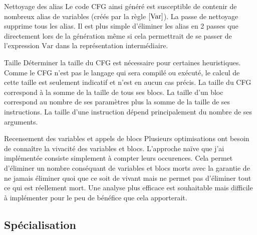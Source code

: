\documentclass{beamer}
\begin{document}
\begin{frame}{Nettoyage des alias}
    Le code CFG ainsi généré est susceptible de contenir de nombreux alias de variables (créés par la règle $\eqref{Var}$). La passe de nettoyage supprime tous les alias. Il est plus simple d'éliminer les alias en 2 passes que directement lors de la génération même si cela permettrait de se passer de l'expression $\text{Var}$ dans la représentation intermédiaire.
\end{frame}

\begin{frame}{Taille}
    Déterminer la taille du CFG est nécessaire pour certaines heuristiques. Comme le CFG n'est pas le langage qui sera compilé ou exécuté, le calcul de cette taille est seulement indicatif et n'est en aucun cas précis. La taille du CFG correspond à la somme de la taille de tous ses blocs. La taille d'un bloc correspond au nombre de ses paramètres plus la somme de la taille de ses instructions. La taille d'une instruction dépend principalement du nombre de ses arguments.
\end{frame}

\begin{frame}{Recensement des variables et appels de blocs}
    Plusieurs optimisations ont besoin de connaître la vivacité des variables et blocs. L'approche naïve que j'ai implémentée consiste simplement à compter leurs occurences. Cela permet d'éliminer un nombre conséquant de variables et blocs morts avec la garantie de ne jamais éliminer quoi que ce soit de vivant mais ne permet pas d'éliminer tout ce qui est réellement mort. Une analyse plus efficace est souhaitable mais difficile à implémenter pour le peu de bénéfice que cela apporterait.
\end{frame}

\subsection{Spécialisation}

\end{document}
